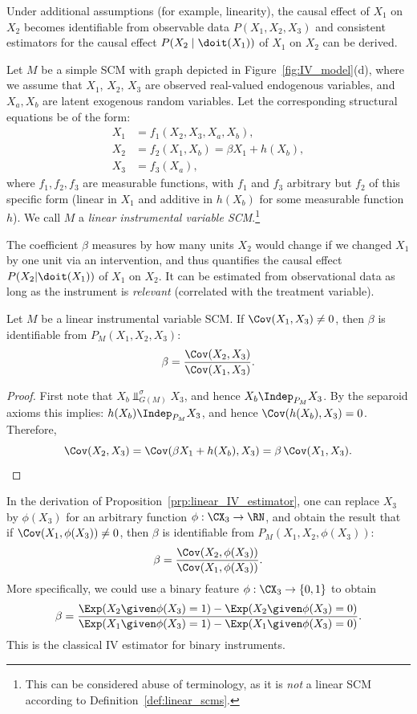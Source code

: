 Under additional assumptions (for example, linearity), the causal effect of $X_1$ on $X_2$ becomes identifiable from observable data $P(X_1,X_2,X_3)$ and consistent estimators for the causal effect $P(X_2 \mid \doit(X_1))$ of $X_1$ on $X_2$ can be derived. 
\begin{Def}\label{def:linear_IV}
Let $M$ be a simple SCM with graph depicted in Figure~\ref{fig:IV_model}(d), where we assume that $X_1$, $X_2$, $X_3$ are observed real-valued endogenous variables, and $X_a, X_b$ are latent exogenous random variables.
Let the corresponding structural equations be of the form:
\begin{align*}
  X_1 &= f_1(X_2,X_3,X_a,X_b), \\
  X_2 &= f_2(X_1,X_b) = \beta X_1 + h(X_b), \\
  X_3 &= f_3(X_a), 
\end{align*}
where $f_1,f_2,f_3$ are measurable functions, with $f_1$ and $f_3$ arbitrary but $f_2$ of this specific form (linear in $X_1$ and additive in $h(X_b)$ for some measurable function $h$).
We call $M$ a \emph{linear instrumental variable SCM}.\footnote{This can be considered abuse of terminology, as it is \emph{not} a linear SCM according to Definition~\ref{def:linear_scms}.}
\end{Def}
The coefficient $\beta$ measures by how many units $X_2$ would change if we changed $X_1$ by one unit via an intervention, and thus quantifies the causal effect $P(X_2|\doit(X_1))$ of $X_1$ on $X_2$.
It can be estimated from observational data as long as the instrument is \emph{relevant} (correlated with the treatment variable).
\begin{Prp}\label{prp:linear_IV_estimator}
  Let $M$ be a linear instrumental variable SCM. 
  If $\Cov(X_1,X_3) \neq 0$, then $\beta$ is identifiable from $P_M(X_1,X_2,X_3)$:
    $$\beta = \frac{\Cov(X_2,X_3)}{\Cov(X_1,X_3)}.$$
\end{Prp}
\begin{proof}
First note that $X_b \Perp^\sigma_{G(M)} X_3$, and hence $X_b \Indep_{P_M} X_3$.
By the separoid axioms this implies: $h(X_b) \Indep_{P_M} X_3$, and hence $\Cov(h(X_b),X_3) = 0$.
Therefore,
$$ \Cov(X_2,X_3) = \Cov(\beta  X_1 + h(X_b),X_3) = \beta \,\Cov(X_1,X_3).$$
\end{proof}
\begin{Rem}
In the derivation of Proposition~\ref{prp:linear_IV_estimator}, one can replace $X_3$ by $\phi(X_3)$ for an arbitrary function $\phi : \CX_3 \to \RN$, and obtain the result that
if $\Cov(X_1,\phi(X_3)) \neq 0$, then $\beta$ is identifiable from $P_M(X_1,X_2,\phi(X_3))$:
  $$\beta = \frac{\Cov(X_2,\phi(X_3))}{\Cov(X_1,\phi(X_3))}.$$
More specifically, we could use a binary feature $\phi : \CX_3 \to \{0,1\}$ to obtain
  $$\beta = \frac{\Exp(X_2 \given \phi(X_3)=1) - \Exp(X_2 \given \phi(X_3)=0)}{\Exp(X_1 \given \phi(X_3)=1) - \Exp(X_1 \given \phi(X_3)=0)}.$$
This is the classical IV estimator for binary instruments.
\end{Rem}

